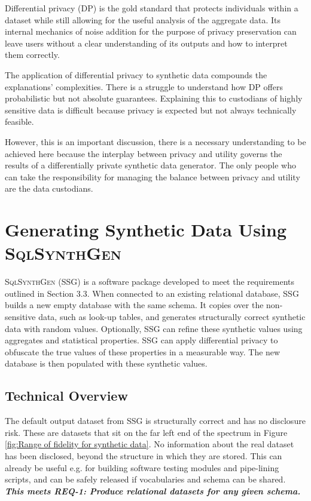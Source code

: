 \documentclass[11pt]{article}
\begin{document}
Differential privacy (DP) \cite{DworkR14} is the gold standard that protects individuals within a dataset while still allowing for the useful analysis of the aggregate data. Its internal mechanics  of noise addition for the purpose of privacy preservation can leave users without a clear understanding of its outputs and how to interpret them correctly\cite{Dankar2013}.

The application of differential privacy to synthetic data compounds the explanations' complexities. There is a struggle to understand how DP offers probabilistic but not absolute guarantees. Explaining this to custodians of highly sensitive data is difficult because privacy is expected but not always technically feasible. 

However, this is an important discussion, there is a necessary understanding to be achieved here because the interplay between privacy and utility governs the results of a differentially private synthetic data generator. The only people who can take the responsibility for managing the balance between privacy and utility are the data custodians.
 
\section{Generating Synthetic Data Using \textsc{SqlSynthGen}}

\textsc{SqlSynthGen} (SSG) is a software package developed to meet the requirements outlined in Section 3.3. When connected to an existing relational database, SSG builds a new empty database with the same schema. It copies over the non-sensitive data, such as look-up tables, and generates structurally correct synthetic data with random values. Optionally, SSG can refine these synthetic values using aggregates and statistical properties. SSG can apply differential privacy to obfuscate the true values of these properties in a measurable way. The new database is then populated with these synthetic values.  

\subsection{Technical Overview}

The default output dataset from SSG is structurally correct and has no disclosure risk. These are datasets that sit on the far left end of the spectrum in Figure \ref{fig:Range of fidelity for synthetic data}. No information about the real dataset has been disclosed, beyond the structure in which they are stored. This can already be useful e.g. for building software testing modules and pipe-lining scripts, and can be safely released if vocabularies and schema can be shared. \textbf{\textit{This meets REQ-1: Produce relational datasets for any given schema.}}
\end{document}

